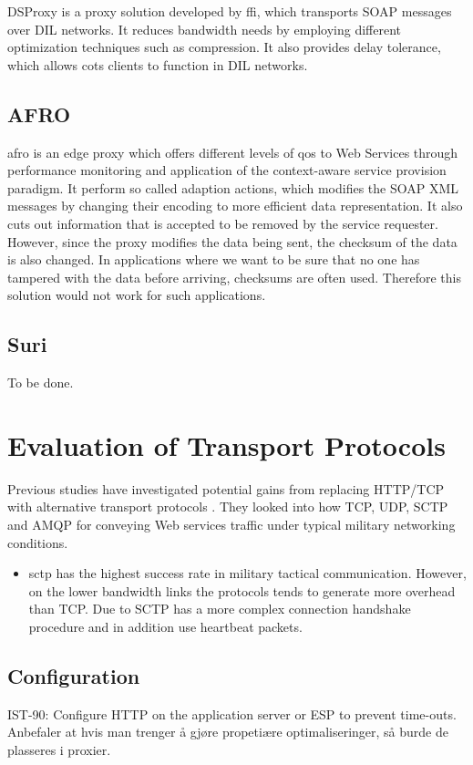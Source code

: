DSProxy is a proxy solution developed by \gls{ffi}, which transports SOAP
messages over DIL networks. It reduces bandwidth needs by employing different
optimization techniques such as compression. It also provides delay tolerance,
which allows \gls{cots} clients to function in DIL networks.


\subsection{AFRO}

\gls{afro} is an edge proxy which offers different levels of \gls{qos} to Web
Services through performance monitoring and application of the context-aware
service provision paradigm. It perform so called adaption actions, which
modifies the SOAP XML messages by changing their encoding to more efficient data
representation. It also cuts out information that is accepted to be removed by
the service requester. However, since the proxy modifies the data being sent,
the checksum of the data is also changed. In applications where we want to be
sure that no one has tampered with the data before arriving, checksums are often
used. Therefore this solution would not work for such applications.


\subsection{Suri}
To be done.

\section{Evaluation of Transport Protocols}

Previous studies have investigated potential gains from replacing HTTP/TCP
with alternative transport protocols
\cite{evaluation-transport-protocols-web-services}. They looked into how TCP,
UDP, SCTP and AMQP for conveying Web services traffic under typical military
networking conditions.

\begin{itemize}
    \item \gls{sctp} has the highest success rate in military tactical
    communication. However, on the lower bandwidth links the protocols tends to
     generate more overhead than TCP. Due to SCTP has a more complex connection
     handshake procedure and in addition use heartbeat packets.
\end{itemize}

\subsection{Configuration}
IST-90: Configure HTTP on the application server or ESP to prevent time-outs.
Anbefaler at hvis man trenger å gjøre propetiære optimaliseringer, så burde de
plasseres i proxier.

